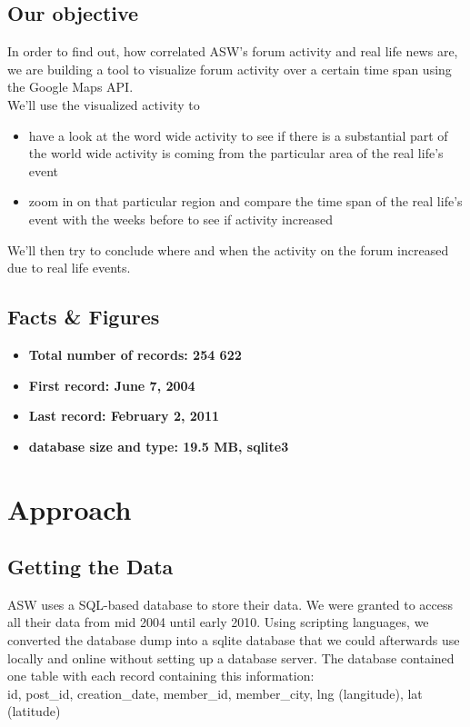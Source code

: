\documentclass[11pt,a4paper,english]{article}
\begin{document}
		\subsection{Our objective}
			In order to find out, how correlated ASW's forum activity and real life news are, we are building a tool to visualize forum activity over a certain time span using the Google Maps API.
			\\ We'll use the visualized activity to \begin{itemize}
				\item have a look at the word wide activity to see if there is a substantial part of the world wide activity is coming from the particular area of the real life's event
				\item zoom in on that particular region and compare the time span of the real life's event with the weeks before to see if activity increased
			\end{itemize}
			We'll then try to conclude where and when the activity on the forum increased due to real life events.
			
		\subsection{Facts \& Figures}
			\begin{itemize}
				\item \bf Total number of records: \rm 254 622
				\item \bf First record: \rm June 7, 2004
				\item \bf Last record: \rm February 2, 2011
				\item \bf database size and type: \rm 19.5 MB, sqlite3
			\end{itemize}
			 		
	\section{Approach}
		\subsection{Getting the Data}
		ASW uses a SQL-based database to store their data. We were granted to access all their data from mid 2004 until early 2010. Using scripting languages, we converted the database dump into a sqlite database that we could afterwards use locally and online without setting up a database server. The database contained one table with each record containing this information: 
		\\ id, post\_id, creation\_date, member\_id, member\_city, lng (langitude), lat (latitude) 
		
\end{document}
